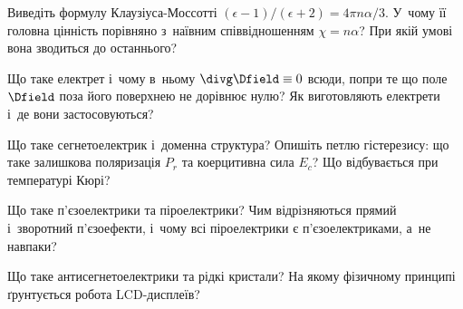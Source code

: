 \begin{Questions}
\begin{quizlist}
		\item Виведіть формулу Клаузіуса-Моссотті $(\epsilon-1)/(\epsilon+2) = 4\pi
			n\alpha/3$. У~чому її головна цінність порівняно з~наївним співвідношенням
		$\chi=n\alpha$? При якій умові вона зводиться до останнього?
		\item Що таке електрет і~чому в~ньому $\divg\Dfield\equiv0$ всюди, попри те що поле
		$\Dfield$ поза його поверхнею не дорівнює нулю? Як виготовляють електрети і~де вони
		застосовуються?
		\item Що таке сегнетоелектрик і~доменна структура? Опишіть петлю гістерезису: що таке
		залишкова поляризація $P_r$ та коерцитивна сила $E_c$? Що відбувається при
		температурі Кюрі?
		\item Що таке п'єзоелектрики та піроелектрики? Чим відрізняються прямий і~зворотний
		п'єзоефекти, і~чому всі піроелектрики є п'єзоелектриками, а~не навпаки?
		\item Що таке антисегнетоелектрики та рідкі кристали? На якому фізичному принципі
		ґрунтується робота LCD-дисплеїв?
	\end{quizlist}
\end{Questions}